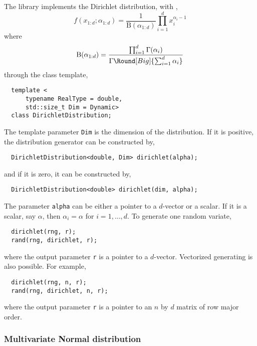 The library implements the Dirichlet distribution, with \pdf,
\begin{equation*}
  f(x_{1:d};\alpha_{1:d}) = \frac{1}{\mathrm{B}(\alpha_{1:d})}
  \prod_{i=1}^d x_i^{\alpha_i - 1}
\end{equation*}
where
\begin{equation*}
  \mathrm{B}(\alpha_{1:d}) =
  \frac{\prod_{i=1}^d\Gamma(\alpha_i)}
  {\Gamma\Round[Big]{\sum_{i=1}^d\alpha_i}}
\end{equation*}
through the class template,
\begin{Verbatim}
  template <
      typename RealType = double,
      std::size_t Dim = Dynamic>
  class DirichletDistribution;
\end{Verbatim}
The template parameter \verb|Dim| is the dimension of the distribution. If it
is positive, the distribution generator can be constructed by,
\begin{Verbatim}
  DirichletDistribution<double, Dim> dirichlet(alpha);
\end{Verbatim}
and if it is zero, it can be constructed by,
\begin{Verbatim}
  DirichletDistribution<double> dirichlet(dim, alpha);
\end{Verbatim}
The parameter \verb|alpha| can be either a pointer to a $d$-vector or a scalar.
If it is a scalar, say $\alpha$, then $\alpha_i = \alpha$ for $i = 1,\dots,d$.
To generate one random variate,
\begin{Verbatim}
  dirichlet(rng, r);
  rand(rng, dirichlet, r);
\end{Verbatim}
where the output parameter \verb|r| is a pointer to a $d$-vector. Vectorized
generating is also possible. For example,
\begin{Verbatim}
  dirichlet(rng, n, r);
  rand(rng, dirichlet, n, r);
\end{Verbatim}
where the output parameter \verb|r| is a pointer to an $n$ by $d$ matrix of row
major order.

\subsubsection{Multivariate Normal distribution}

